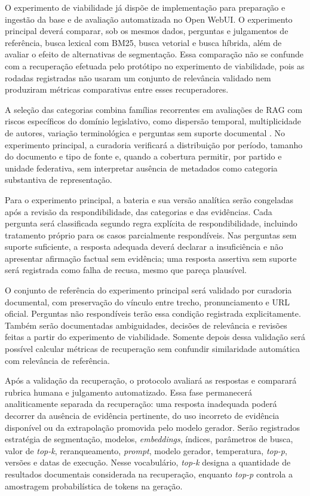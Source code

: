 O experimento de viabilidade já dispõe de implementação para preparação e ingestão da base e de avaliação automatizada no Open WebUI. O experimento principal deverá comparar, sob os mesmos dados, perguntas e julgamentos de referência, busca lexical com BM25, busca vetorial e busca híbrida, além de avaliar o efeito de alternativas de segmentação. Essa comparação não se confunde com a recuperação efetuada pelo protótipo no experimento de viabilidade, pois as rodadas registradas não usaram um conjunto de relevância validado nem produziram métricas comparativas entre esses recuperadores.

A seleção das categorias combina famílias recorrentes em avaliações de RAG com riscos específicos do domínio legislativo, como dispersão temporal, multiplicidade de autores, variação terminológica e perguntas sem suporte documental \parencite{zhuEtAl2025rageval,saadFalconEtAl2024ares,esEtAl2023ragas,pipitoneAlami2024legalbenchRag,dahlEtAl2024largeLegalFictions}. No experimento principal, a curadoria verificará a distribuição por período, tamanho do documento e tipo de fonte e, quando a cobertura permitir, por partido e unidade federativa, sem interpretar ausência de metadados como categoria substantiva de representação.

Para o experimento principal, a bateria e sua versão analítica serão congeladas após a revisão da respondibilidade, das categorias e das evidências. Cada pergunta será classificada segundo regra explícita de respondibilidade, incluindo tratamento próprio para os casos parcialmente respondíveis. Nas perguntas sem suporte suficiente, a resposta adequada deverá declarar a insuficiência e não apresentar afirmação factual sem evidência; uma resposta assertiva sem suporte será registrada como falha de recusa, mesmo que pareça plausível.

O conjunto de referência do experimento principal será validado por curadoria documental, com preservação do vínculo entre trecho, pronunciamento e URL oficial. Perguntas não respondíveis terão essa condição registrada explicitamente. Também serão documentadas ambiguidades, decisões de relevância e revisões feitas a partir do experimento de viabilidade. Somente depois dessa validação será possível calcular métricas de recuperação sem confundir similaridade automática com relevância de referência.

Após a validação da recuperação, o protocolo avaliará as respostas e comparará rubrica humana e julgamento automatizado. Essa fase permanecerá analiticamente separada da recuperação: uma resposta inadequada poderá decorrer da ausência de evidência pertinente, do uso incorreto de evidência disponível ou da extrapolação promovida pelo modelo gerador. Serão registrados estratégia de segmentação, modelos, \textit{embeddings}, índices, parâmetros de busca, valor de \textit{top-k}, reranqueamento, \textit{prompt}, modelo gerador, temperatura, \textit{top-p}, versões e datas de execução. Nesse vocabulário, \textit{top-k} designa a quantidade de resultados documentais considerada na recuperação, enquanto \textit{top-p} controla a amostragem probabilística de tokens na geração.

